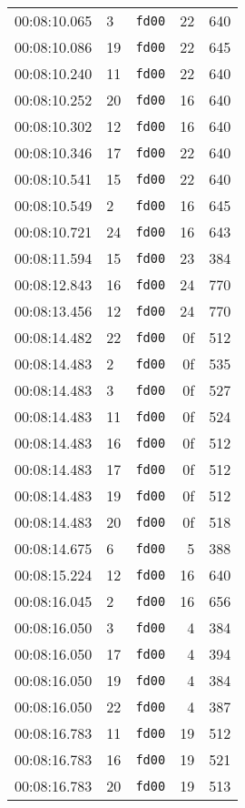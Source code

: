 \documentclass{article}
\begin{document}
\begin{longtable}{lllrr}
00:08:10.065 & 3 & \texttt{fd00} & 22 & 640 \\
00:08:10.086 & 19 & \texttt{fd00} & 22 & 645 \\
00:08:10.240 & 11 & \texttt{fd00} & 22 & 640 \\
00:08:10.252 & 20 & \texttt{fd00} & 16 & 640 \\
00:08:10.302 & 12 & \texttt{fd00} & 16 & 640 \\
00:08:10.346 & 17 & \texttt{fd00} & 22 & 640 \\
00:08:10.541 & 15 & \texttt{fd00} & 22 & 640 \\
00:08:10.549 & 2 & \texttt{fd00} & 16 & 645 \\
00:08:10.721 & 24 & \texttt{fd00} & 16 & 643 \\
00:08:11.594 & 15 & \texttt{fd00} & 23 & 384 \\
00:08:12.843 & 16 & \texttt{fd00} & 24 & 770 \\
00:08:13.456 & 12 & \texttt{fd00} & 24 & 770 \\
00:08:14.482 & 22 & \texttt{fd00} & 0f & 512 \\
00:08:14.483 & 2 & \texttt{fd00} & 0f & 535 \\
00:08:14.483 & 3 & \texttt{fd00} & 0f & 527 \\
00:08:14.483 & 11 & \texttt{fd00} & 0f & 524 \\
00:08:14.483 & 16 & \texttt{fd00} & 0f & 512 \\
00:08:14.483 & 17 & \texttt{fd00} & 0f & 512 \\
00:08:14.483 & 19 & \texttt{fd00} & 0f & 512 \\
00:08:14.483 & 20 & \texttt{fd00} & 0f & 518 \\
00:08:14.675 & 6 & \texttt{fd00} & 5 & 388 \\
00:08:15.224 & 12 & \texttt{fd00} & 16 & 640 \\
00:08:16.045 & 2 & \texttt{fd00} & 16 & 656 \\
00:08:16.050 & 3 & \texttt{fd00} & 4 & 384 \\
00:08:16.050 & 17 & \texttt{fd00} & 4 & 394 \\
00:08:16.050 & 19 & \texttt{fd00} & 4 & 384 \\
00:08:16.050 & 22 & \texttt{fd00} & 4 & 387 \\
00:08:16.783 & 11 & \texttt{fd00} & 19 & 512 \\
00:08:16.783 & 16 & \texttt{fd00} & 19 & 521 \\
00:08:16.783 & 20 & \texttt{fd00} & 19 & 513 \\

\end{longtable}
\end{document}
